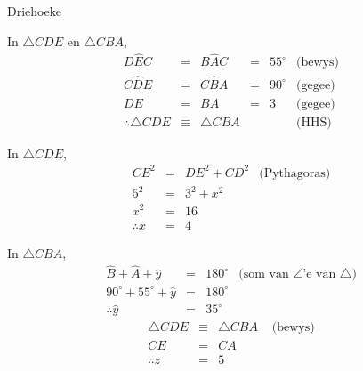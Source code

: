 \begin{wex}{Driehoeke}
{In $\triangle CDE$ en $\triangle CBA$,
\begin{equation*}
 \begin{array}{rcclll}
D\hat{E}C &=& B\hat{A}C &=& 55^{\circ}  & \mbox{(bewys)} \\
C\hat{D}E &=& C\hat{B}A &=& 90^{\circ}  & \mbox{(gegee)} \\
DE &=& BA &=& 3  & \mbox{(gegee)} \\
\therefore \triangle{CDE} &\equiv& \triangle {CBA} &&& \mbox{(HHS)} 
 \end{array}
\end{equation*}

In $\triangle CDE$,
\begin{equation*}
 \begin{array}{rcll}

CE^{2} &=& DE^{2} + CD^{2} & \mbox{(Pythagoras)} \\
5^{2} &=& 3^{2} + x^{2} &  \\
x^{2} &=& 16 & \\
\therefore x &=& 4 & 
 \end{array}
\end{equation*}

In $\triangle CBA$,
\begin{equation*}
 \begin{array}{rcll}
\hat{B} + \hat{A} + \hat{y} &=& 180^{\circ}  & \mbox{(som van $\angle$'e van $\triangle$)} \\
90^{\circ} + 55^{\circ} + \hat{y} &=& 180^{\circ}  & \\
\therefore \hat{y} &=& 35^{\circ} & 
 \end{array}
\end{equation*}
\begin{equation*}
 \begin{array}{rcll}
\triangle CDE &\equiv& \triangle CBA &\mbox{ (bewys)} \\
 CE &=& CA  & \\
 \therefore z &=& 5 & 
 \end{array}
\end{equation*}

}
\end{wex}

